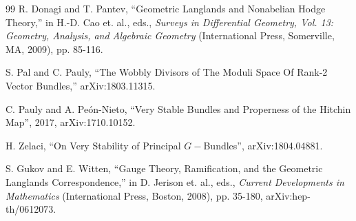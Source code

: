 \documentclass[11pt,a4paper]{article}
\begin{document}
\begin{thebibliography}{99}
R. Donagi and T. Pantev, ``Geometric Langlands and Nonabelian Hodge Theory,'' in H.-D. Cao et. al., eds., {\it Surveys in Differential Geometry, Vol. 13: Geometry,
Analysis, and Algebraic Geometry} (International Press, Somerville, MA, 2009), pp. 85-116.

S. Pal and C. Pauly, ``The Wobbly Divisors of The Moduli Space Of Rank-2 Vector Bundles,'' arXiv:1803.11315.


 C. Pauly and A. Pe{\'o}n-Nieto,
``Very Stable Bundles and Properness of the Hitchin Map'',
2017, arXiv:1710.10152.

 H. Zelaci,  
``On Very Stability of Principal $G-$Bundles'', 
 arXiv:1804.04881.



S. Gukov and E. Witten, ``Gauge Theory, Ramification, and the Geometric Langlands Correspondence,'' in D. Jerison et. al., eds., {\it 
Current Developments in Mathematics}  (International Press, Boston, 2008), pp. 35-180,
arXiv:hep-th/0612073.





\end{thebibliography}
\end{document}
